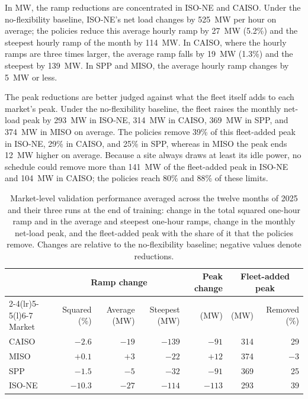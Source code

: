\documentclass{UNCC-thesis}
\begin{document}
In MW, the ramp reductions are concentrated in ISO-NE and CAISO. Under the no-flexibility
baseline, ISO-NE's net load changes by 525~MW per hour on average; the policies reduce this
average hourly ramp by 27~MW (5.2\%) and the steepest hourly ramp of the month by 114~MW. In
CAISO, where the hourly ramps are three times larger, the average ramp falls by 19~MW (1.3\%) and
the steepest by 139~MW. In SPP and MISO, the average hourly ramp changes by 5~MW or less.

The peak reductions are better judged against what the fleet itself adds to each market's peak.
Under the no-flexibility baseline, the fleet raises the monthly net-load peak by 293~MW in ISO-NE,
314~MW in CAISO, 369~MW in SPP, and 374~MW in MISO on average. The policies remove 39\% of this
fleet-added peak in ISO-NE, 29\% in CAISO, and 25\% in SPP, whereas in MISO the peak ends 12~MW
higher on average. Because a site always draws at least its idle power, no schedule could remove
more than 141~MW of the fleet-added peak in ISO-NE and 104~MW in CAISO; the policies reach 80\% and
88\% of these limits.

\begin{table}[htbp]
  \centering
  \footnotesize
  \caption[Cross-validation results by market]{Market-level validation performance averaged
  across the twelve months of 2025 and their three runs at the end of training: change in the
  total squared one-hour ramp and in the average and steepest one-hour ramps, change in the
  monthly net-load peak, and the fleet-added peak with the share of it that the policies remove.
  Changes are relative to the no-flexibility baseline; negative values denote reductions.}
  \label{tab:regions}
  \begin{tabular}{@{}lrrrrrr@{}}
    \toprule
    & \multicolumn{3}{c}{Ramp change} & Peak change & \multicolumn{2}{c}{Fleet-added peak} \\
    \cmidrule(lr){2-4}\cmidrule(lr){5-5}\cmidrule(l){6-7}
    Market & Squared (\%) & Average (MW) & Steepest (MW) & (MW) & (MW) & Removed (\%) \\
    \midrule
    CAISO          & \(-2.6\) & \(-19\) & \(-139\) & \(-91\) & 314 & 29 \\
    MISO           & \(+0.1\) & \(+3\) & \(-22\) & \(+12\) & 374 & \(-3\) \\
    SPP            & \(-1.5\) & \(-5\) & \(-32\) & \(-91\) & 369 & 25 \\
    ISO-NE         & \(-10.3\) & \(-27\) & \(-114\) & \(-113\) & 293 & 39 \\
    \bottomrule
  \end{tabular}
\end{table}
\end{document}
